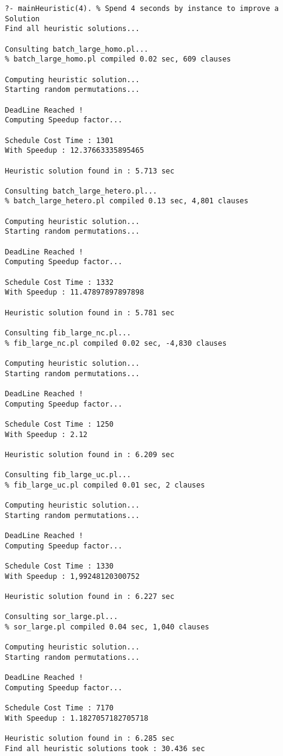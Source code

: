 \documentclass[11pt, a4paper, margin = 1.3cm]{article}
\begin{document}
\begin{verbatim}
?- mainHeuristic(4). % Spend 4 seconds by instance to improve a Solution   
Find all heuristic solutions...

Consulting batch_large_homo.pl...
% batch_large_homo.pl compiled 0.02 sec, 609 clauses

Computing heuristic solution...
Starting random permutations...

DeadLine Reached !
Computing Speedup factor...

Schedule Cost Time : 1301
With Speedup : 12.37663335895465

Heuristic solution found in : 5.713 sec

Consulting batch_large_hetero.pl...
% batch_large_hetero.pl compiled 0.13 sec, 4,801 clauses

Computing heuristic solution...
Starting random permutations...

DeadLine Reached !
Computing Speedup factor...

Schedule Cost Time : 1332
With Speedup : 11.47897897897898

Heuristic solution found in : 5.781 sec

Consulting fib_large_nc.pl...
% fib_large_nc.pl compiled 0.02 sec, -4,830 clauses

Computing heuristic solution...
Starting random permutations...

DeadLine Reached !
Computing Speedup factor...

Schedule Cost Time : 1250
With Speedup : 2.12

Heuristic solution found in : 6.209 sec

Consulting fib_large_uc.pl...
% fib_large_uc.pl compiled 0.01 sec, 2 clauses

Computing heuristic solution...
Starting random permutations...

DeadLine Reached !
Computing Speedup factor...

Schedule Cost Time : 1330
With Speedup : 1,99248120300752

Heuristic solution found in : 6.227 sec

Consulting sor_large.pl...
% sor_large.pl compiled 0.04 sec, 1,040 clauses

Computing heuristic solution...
Starting random permutations...

DeadLine Reached !
Computing Speedup factor...

Schedule Cost Time : 7170
With Speedup : 1.1827057182705718

Heuristic solution found in : 6.285 sec
Find all heuristic solutions took : 30.436 sec
\end{verbatim}
\end{document}
